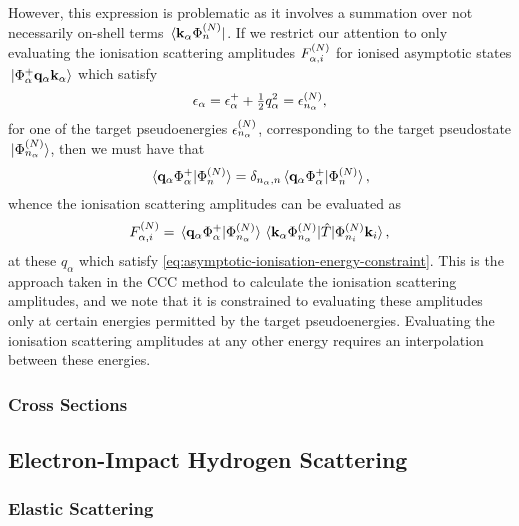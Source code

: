 \documentclass[draft]{article}
\begin{document}
However, this expression is problematic as it involves a summation over
not necessarily on-shell terms $\bra*{\vb{k}_{\alpha}\Phi_{n}^{(N)}}$.
If we restrict our attention to only evaluating the ionisation scattering
amplitudes $F_{\alpha, i}^{(N)}$ for ionised asymptotic states
$\ket*{\Phi_{\alpha}^{+} \vb{q}_{\alpha} \vb{k}_{\alpha}}$ which satisfy
\begin{equation}
  \label{eq:asymptotic-ionisation-energy-constraint}
  \epsilon_{\alpha}
  =
  \epsilon_{\alpha}^{+}
  +
  \tfrac{1}{2}
  q_{\alpha}^{2}
  =
  \epsilon_{n_{\alpha}}^{(N)}
  ,
\end{equation}
for one of the target pseudoenergies $\epsilon_{n_{\alpha}}^{(N)}$,
corresponding to the target pseudostate $\ket*{\Phi_{n_{\alpha}}^{(N)}}$, then
we must have that
\begin{equation}
  \label{eq:asymptotic-ionisation-overlap}
  \braket*
  {\vb{q}_{\alpha} \Phi_{\alpha}^{+}}
  {\Phi_{n}^{(N)}}
  =
  \delta_{n_{\alpha}, n}
  \braket*
  {\vb{q}_{\alpha} \Phi_{\alpha}^{+}}
  {\Phi_{n}^{(N)}}
  ,
\end{equation}
whence the ionisation scattering amplitudes can be evaluated as
\begin{equation}
  \label{eq:scattering-amplitude-ionisation-evaluated}
  F_{\alpha, i}^{(N)}
  =
  \braket*
  {\vb{q}_{\alpha} \Phi_{\alpha}^{+}}
  {\Phi_{n_{\alpha}}^{(N)}}
  \mel*
  {\vb{k}_{\alpha} \Phi_{n_{\alpha}}^{(N)}}
  {\hat{T}}
  {\Phi_{n_{i}}^{(N)} \vb{k}_{i}}
  ,
\end{equation}
at these $q_{\alpha}$ which satisfy
\autoref{eq:asymptotic-ionisation-energy-constraint}.
This is the approach taken in the CCC method to calculate the ionisation
scattering amplitudes, and we note that it is constrained to evaluating these
amplitudes only at certain energies permitted by the target pseudoenergies.
Evaluating the ionisation scattering amplitudes at any other energy requires
an interpolation between these energies.

\subsubsection{Cross Sections}
\label{sec:cross-sections}

\subsection{Electron-Impact Hydrogen Scattering}
\label{sec:e-h}

\subsubsection{Elastic Scattering}
\label{sec:e-h-elastic-scattering}
\end{document}
